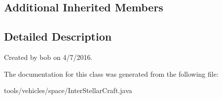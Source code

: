 \subsection*{Additional Inherited Members}


\subsection{Detailed Description}
Created by bob on 4/7/2016. 

The documentation for this class was generated from the following file\+:\begin{DoxyCompactItemize}
\item 
tools/vehicles/space/Inter\+Stellar\+Craft.\+java\end{DoxyCompactItemize}
